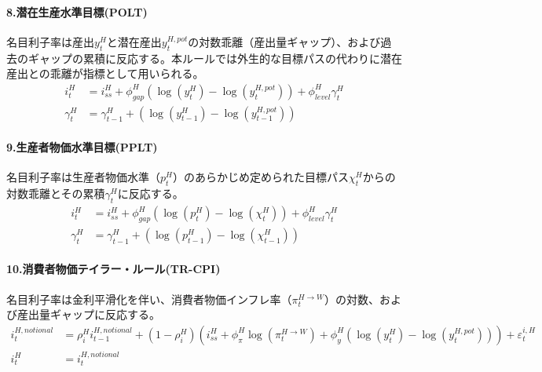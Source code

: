 \paragraph{8.潜在生産水準目標(POLT)}
\label{sec:chapter3_policies_monetary_home_polt}
名目利子率は産出\(y_t^H\)と潜在産出\(y_t^{H,pot}\)の対数乖離（産出量ギャップ）、および過去のギャップの累積に反応する。本ルールでは外生的な目標パスの代わりに潜在産出との乖離が指標として用いられる。
\begin{align}
\label{form:chapter3_policies_monetary_home_polt_i_H_eq}
    i_t^H&=i_{ss}^H+\phi_{gap}^H(\log(y_t^H)-\log(y_t^{H,pot}))+\phi_{level}^H\gamma_t^H \\
\label{form:chapter3_policies_monetary_home_polt_gamma_H_eq}
    \gamma_t^H&=\gamma_{t-1}^H+(\log(y_{t-1}^H)-\log(y_{t-1}^{H,pot}))
\end{align}

\paragraph{9.生産者物価水準目標(PPLT)}
\label{sec:chapter3_policies_monetary_home_pplt}
名目利子率は生産者物価水準（\(p_t^H\)）のあらかじめ定められた目標パス\(\chi_t^H\)からの対数乖離とその累積\(\gamma_t^H\)に反応する。
\begin{align}
\label{form:chapter3_policies_monetary_home_pplt_i_H_eq}
    i_t^H&=i_{ss}^H+\phi_{gap}^H(\log(p_t^H)-\log(\chi_t^H))+\phi_{level}^H\gamma_t^H \\
\label{form:chapter3_policies_monetary_home_pplt_gamma_H_eq}
    \gamma_t^H&=\gamma_{t-1}^H+(\log(p_{t-1}^H)-\log(\chi_{t-1}^H))
\end{align}

\paragraph{10.消費者物価テイラー・ルール(TR-CPI)}
\label{sec:chapter3_policies_monetary_home_tr_cpi}
名目利子率は金利平滑化を伴い、消費者物価インフレ率（\(\pi_t^{H\to W}\)）の対数、および産出量ギャップに反応する。
\begin{align}
\label{form:chapter3_policies_monetary_home_tr_cpi_i_H_notional_eq}
    i_t^{H,notional}&=\rho_i^Hi_{t-1}^{H,notional}+(1-\rho_i^H)\left(i_{ss}^H+\phi_{\pi}^H\log(\pi_t^{H\to W})+\phi_y^H(\log(y_t^H)-\log(y_t^{H,pot}))\right)+\varepsilon_t^{i,H} \\
\label{form:chapter3_policies_monetary_home_tr_cpi_i_H_eq}
    i_t^H&=i_t^{H,notional}
\end{align}

